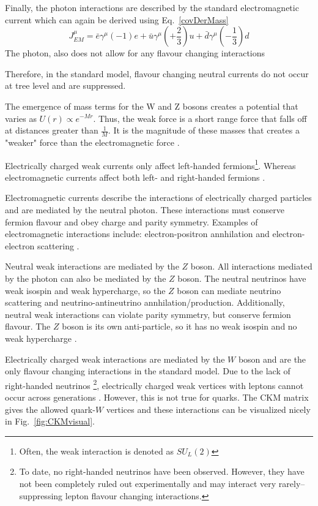 Finally, the photon interactions are described by the standard electromagnetic current which can again be derived using Eq.~\ref{covDerMass}
\begin{equation}
    J^{\mu}_{EM}=\bar{e}\gamma^{\mu}(-1)e + \bar{u}\gamma^{\mu}(+\frac{2}{3})u + \bar{d}\gamma^{\mu}(-\frac{1}{3})d
\end{equation}
The photon, also does not allow for any flavour changing interactions \cite{Peskin}

Therefore, in the standard model, flavour changing neutral currents do not occur at tree level and are suppressed.


The emergence of mass terms for the W and Z bosons creates a potential that varies as $U(r)\propto e^{-M r}$. Thus, the weak force is a short range force that falls off at distances greater than $\frac{1}{M}$. It is the magnitude of these masses that creates a "weaker" force than the electromagnetic force \cite{Blundell}. 

Electrically charged weak currents only affect left-handed fermions\footnote{Often, the weak interaction is denoted as $SU_{L}(2)$}. Whereas electromagnetic currents affect both left- and right-handed fermions \cite{Griffiths}. 

Electromagnetic currents describe the interactions of electrically charged particles and are mediated by the neutral photon. These interactions must conserve fermion flavour and obey charge and parity symmetry. Examples of electromagnetic interactions include: electron-positron annhilation and electron-electron scattering \cite{Griffiths}.

Neutral weak interactions are mediated by the $Z$ boson. All interactions mediated by the photon can also be mediated by the $Z$ boson. The neutral neutrinos have weak isospin and weak hypercharge, so the $Z$ boson can mediate neutrino scattering and neutrino-antineutrino annhilation/production. Additionally, neutral weak interactions can violate parity symmetry, but conserve fermion flavour. The $Z$ boson is its own anti-particle, so it has no weak isospin and no weak hypercharge \cite{Griffiths}.

Electrically charged weak interactions are mediated by the $W$ boson and are the only flavour changing interactions in the standard model. Due to the lack of right-handed neutrinos \footnote{To date, no right-handed neutrinos have been observed. However, they have not been completely ruled out experimentally and may interact very rarely--suppressing lepton flavour changing interactions.}, electrically charged weak vertices with leptons cannot occur across generations \cite{Griffiths}. However, this is not true for quarks. The CKM matrix gives the allowed quark-$W$ vertices and these interactions can be visualized nicely in Fig.~\ref{fig:CKMvisual}.


